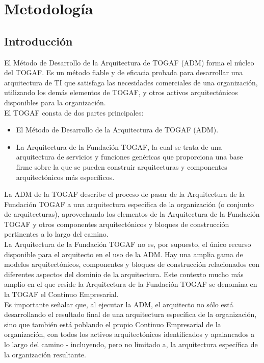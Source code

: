 \chapter{Metodología}
\section{Introducción}

El Método de Desarrollo de la Arquitectura de TOGAF (ADM) forma el núcleo del TOGAF.  Es un método fiable y de eficacia probada para desarrollar una arquitectura de TI que satisfaga las necesidades comerciales de una organización, utilizando los demás elementos de TOGAF, y otros activos arquitectónicos disponibles para la organización. \\

El TOGAF consta de dos partes principales:

\begin{itemize}
	\item    El Método de Desarrollo de la Arquitectura de TOGAF (ADM).
	\item La Arquitectura de la Fundación TOGAF, la cual se trata de una arquitectura de servicios y funciones genéricas que proporciona una base firme sobre la que se pueden construir arquitecturas y componentes arquitectónicos más específicos.
\end{itemize}

La ADM de la TOGAF describe el proceso de pasar de la Arquitectura de la Fundación TOGAF a una arquitectura específica de la organización (o conjunto de arquitecturas), aprovechando los elementos de la Arquitectura de la Fundación TOGAF y otros componentes arquitectónicos y bloques de construcción pertinentes a lo largo del camino.\\

La Arquitectura de la Fundación TOGAF no es, por supuesto, el único recurso disponible para el arquitecto en el uso de la ADM. Hay una amplia gama de modelos arquitectónicos, componentes y bloques de construcción relacionados con diferentes aspectos del dominio de la arquitectura. Este contexto mucho más amplio en el que reside la Arquitectura de la Fundación TOGAF se denomina en la TOGAF el Continuo Empresarial.\\

Es importante señalar que, al ejecutar la ADM, el arquitecto no sólo está desarrollando el resultado final de una arquitectura específica de la organización, sino que también está poblando el propio Continuo Empresarial de la organización, con todos los activos arquitectónicos identificados y apalancados a lo largo del camino - incluyendo, pero no limitado a, la arquitectura específica de la organización resultante.\\

